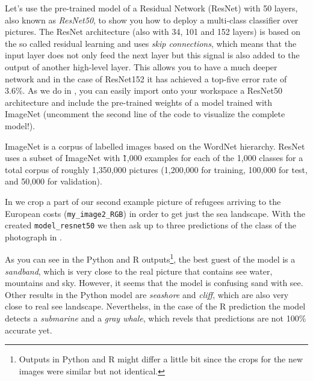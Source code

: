 Let's use the pre-trained model of a Residual Network (ResNet) with 50 layers, also known as \textit{ResNet50}, to show you how to deploy a multi-class classifier over pictures. The ResNet architecture (also with 34, 101 and 152 layers) is based on the so called residual learning and uses \textit{skip connections}, which means that the input layer does not only feed the next layer but this signal is also added to the output of another high-level layer. This allows you to have a much deeper network and in the case of ResNet152 it has achieved a top-five error rate of 3.6\%. As we do in , you can easily import onto your workspace a ResNet50 architecture and include the pre-trained weights of a model trained with ImageNet (uncomment the second line of the code to visualize the complete model!).


ImageNet is a corpus of labelled images based on the WordNet hierarchy. ResNet uses a subset of ImageNet with \~1,000 examples for each of the 1,000 classes for a total corpus of roughly 1,350,000 pictures (1,200,000 for training, 100,000 for test, and 50,000 for validation).

In  we crop a part of our second example picture of refugees arriving to the European costs (\texttt{my\_image2\_RGB}) in order to get just the sea landscape. With the created \texttt{model\_resnet50} we then ask up to three predictions of the class of the photograph in .



As you can see in the Python and R outputs\footnote{Outputs in Python and R might differ a little bit since the crops for the new images were similar but not identical.}, the best guest of the model is a \textit{sandband}, which is very close to the real picture that contains see water, mountains and sky. However, it seems that the model is confusing sand with see. Other results in the Python model are \textit{seashore} and \textit{cliff}, which are also very close to real see landscape. Neverthelss, in the case of the R prediction the model detects a \textit{submarine} and a \textit{gray whale}, which revels that predictions are not 100\% accurate yet.

